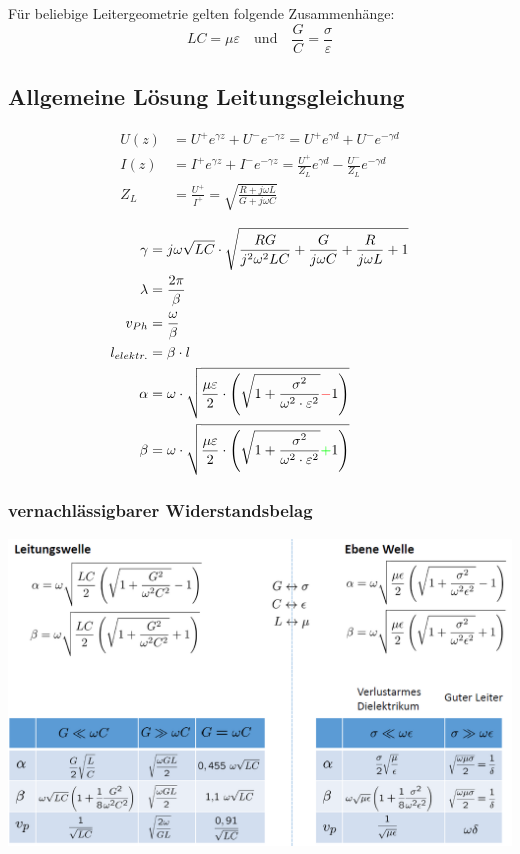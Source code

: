 \vspace{1ex}
Für beliebige Leitergeometrie gelten folgende Zusammenhänge:
\[
    LC = \mu\varepsilon \quad \text{und} \quad \frac{G}{C} = \frac{\sigma}{\varepsilon}
\]

\subsection{Allgemeine Lösung Leitungsgleichung}
\begin{align*}
    U(z) & = U^+ e^{\gamma z} + U^- e^{-\gamma z} = U^+ e^{\gamma d} + U^ - e^{-\gamma d}                      \\
    I(z) & = I^+ e^{\gamma z} + I^- e^{-\gamma z} = \frac{U^+}{Z_L}e^{\gamma d} - \frac{U^-}{Z_L}e^{-\gamma d} \\
    Z_L & = \frac{U^+}{I^+} = \sqrt{ \frac{R + j \omega L}{G + j \omega C}}
\end{align*}

\begin{align*}
    \gamma & = j \omega \sqrt{LC} \cdot \sqrt{ \frac{RG}{j^2 \omega^2 LC} + \frac{G}{j \omega C} + \frac{R}{j \omega L} + 1}\\
    \lambda & = \frac{2 \pi}{\beta} \\
    v_{Ph} & = \frac{\omega}{\beta} \\
    l_{elektr.} & = \beta \cdot l\\
    \alpha                  & = \omega \cdot \sqrt{\dfrac{\mu \varepsilon}{2}\cdot \left(\sqrt{1+\dfrac{\sigma^2}{\omega^2\cdot\varepsilon^2}}{\color{red}{-}}1\right)}   \\
    \beta                   & = \omega \cdot \sqrt{\dfrac{\mu \varepsilon}{2}\cdot \left(\sqrt{1+\dfrac{\sigma^2}{\omega^2\cdot\varepsilon^2}}{\color{green}{+}}1\right)}
\end{align*}

\subsubsection{vernachlässigbarer Widerstandsbelag}
\includegraphics[width=\columnwidth]{Figures/vernachlaessigbarerWiderstandsbelag.png}


